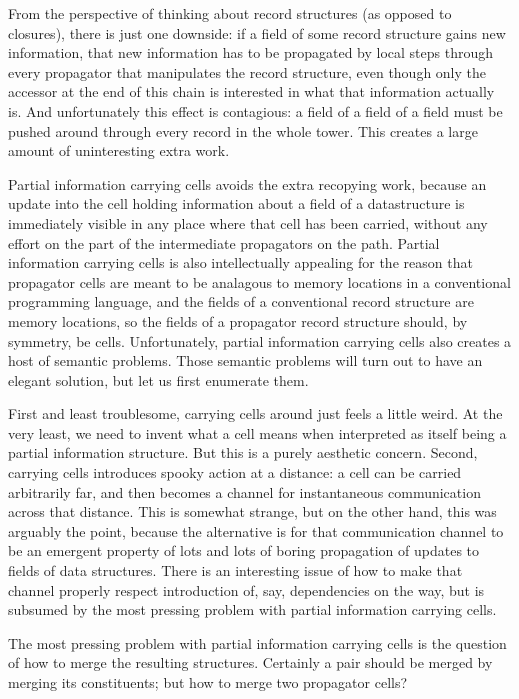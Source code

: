 \documentclass[12pt,letterpaper]{article}
\begin{document}
From the perspective of thinking about record structures (as opposed
to closures), there is just one downside: if a field of some record
structure gains new information, that new information has to be
propagated by local steps through every propagator that manipulates
the record structure, even though only the accessor at the end of this
chain is interested in what that information actually is.  And
unfortunately this effect is contagious: a field of a field of a field
must be pushed around through every record in the whole tower.  This
creates a large amount of uninteresting extra work.

Partial information carrying cells avoids the extra recopying work,
because an update into the cell holding information about a field of a
datastructure is immediately visible in any place where that cell has
been carried, without any effort on the part of the intermediate
propagators on the path.  Partial information carrying cells is also
intellectually appealing for the reason that propagator cells are
meant to be analagous to memory locations in a conventional
programming language, and the fields of a conventional record
structure are memory locations, so the fields of a propagator record
structure should, by symmetry, be cells.  Unfortunately, partial
information carrying cells also creates a host of semantic problems.
Those semantic problems will turn out to have an elegant solution, but
let us first enumerate them.


First and least troublesome, carrying cells around just feels a little
weird.  At the very least, we need to invent what a cell means when
interpreted as itself being a partial information structure.  But this
is a purely aesthetic concern.  Second, carrying cells introduces
spooky action at a distance: a cell can be carried arbitrarily far,
and then becomes a channel for instantaneous communication across that
distance.  This is somewhat strange, but on the other hand, this was
arguably the point, because the alternative is for that communication
channel to be an emergent property of lots and lots of boring
propagation of updates to fields of data structures.  There is an
interesting issue of how to make that channel properly respect
introduction of, say, dependencies on the way, but is subsumed by the
most pressing problem with partial information carrying cells.

The most pressing problem with partial information carrying cells is
the question of how to merge the resulting structures.  Certainly a
pair should be merged by merging its constituents; but how to merge
two propagator cells?
\end{document}
